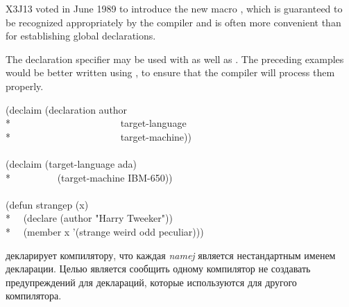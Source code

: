 \begin{flushdesc}
\begin{newer}
X3J13 voted in June 1989 
to introduce the new macro , which is guaranteed
to be recognized appropriately by the compiler and is often more convenient
than  for establishing global declarations.

The  declaration specifier may be used with 
as well as .  The preceding examples would be better written
using , to ensure that the compiler will process them properly.

\begin{lisp}
(declaim (declaration author \\*
~~~~~~~~~~~~~~~~~~~~~~target-language \\*
~~~~~~~~~~~~~~~~~~~~~~target-machine)) \\
 \\
(declaim (target-language ada) \\*
~~~~~~~~~(target-machine IBM-650)) \\
 \\
(defun strangep (x) \\*
~~(declare (author "Harry Tweeker")) \\*
~~(member x '(strange weird odd peculiar)))
\end{lisp}
\end{newer}

\item[\cdf{declaration}]
 декларирует компилятору, что
каждая \emph{namej} является нестандартным именем декларации.
Целью является сообщить одному компилятор не создавать предупреждений для
деклараций, которые используются для другого компилятора.

\end{flushdesc}

